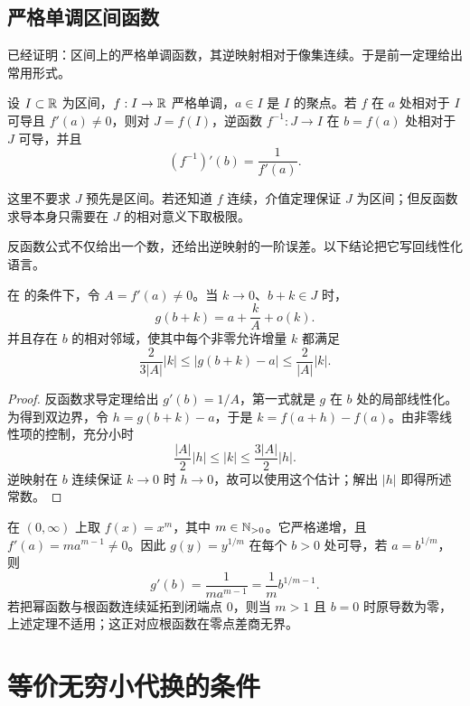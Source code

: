\subsection{严格单调区间函数}

已经证明：区间上的严格单调函数，其逆映射相对于像集连续。于是前一定理给出常用形式。

\begin{corollary}[严格单调函数的逆导数]
设 \(I\subset\mathbb{R}\) 为区间，\(f:I\to\mathbb{R}\) 严格单调，\(a\in I\) 是 \(I\) 的聚点。若 \(f\) 在 \(a\) 处相对于 \(I\) 可导且 \(f'(a)\ne0\)，则对 \(J=f(I)\)，逆函数 \(f^{-1}:J\to I\) 在 \(b=f(a)\) 处相对于 \(J\) 可导，并且
\[
 (f^{-1})'(b)=\frac1{f'(a)}.
\]
\end{corollary}

这里不要求 \(J\) 预先是区间。若还知道 \(f\) 连续，介值定理保证 \(J\) 为区间；但反函数求导本身只需要在 \(J\) 的相对意义下取极限。

反函数公式不仅给出一个数，还给出逆映射的一阶误差。以下结论把它写回线性化语言。

\begin{corollary}[逆映射的局部线性化]
\label{cor:inverse-map-linearization}
在  的条件下，令 \(A=f'(a)\ne0\)。当 \(k\to0\)、\(b+k\in J\) 时，
\[
 g(b+k)=a+\frac{k}{A}+o(k).
\]
并且存在 \(b\) 的相对邻域，使其中每个非零允许增量 \(k\) 都满足
\[
 \frac{2}{3|A|}|k|
 \le |g(b+k)-a|
 \le \frac{2}{|A|}|k|.
\]
\end{corollary}

\begin{proof}
反函数求导定理给出 \(g'(b)=1/A\)，第一式就是 \(g\) 在 \(b\) 处的局部线性化。为得到双边界，令 \(h=g(b+k)-a\)，于是 \(k=f(a+h)-f(a)\)。由非零线性项的控制，充分小时
\[
 \frac{|A|}{2}|h|\le |k|\le\frac{3|A|}{2}|h|.
\]
逆映射在 \(b\) 连续保证 \(k\to0\) 时 \(h\to0\)，故可以使用这个估计；解出 \(|h|\) 即得所述常数。
\end{proof}

\begin{example}
在 \((0,\infty)\) 上取 \(f(x)=x^m\)，其中 \(m\in\mathbb{N}_{>0}\)。它严格递增，且 \(f'(a)=ma^{m-1}\ne0\)。因此 \(g(y)=y^{1/m}\) 在每个 \(b>0\) 处可导，若 \(a=b^{1/m}\)，则
\[
 g'(b)=\frac1{ma^{m-1}}
 =\frac1m b^{1/m-1}.
\]
若把幂函数与根函数连续延拓到闭端点 \(0\)，则当 \(m>1\) 且 \(b=0\) 时原导数为零，上述定理不适用；这正对应根函数在零点差商无界。
\end{example}

\section{等价无穷小代换的条件}
\label{sec:equivalent-infinitesimal-substitution}

